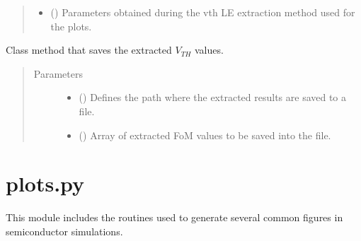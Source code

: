 \documentclass[letterpaper,10pt,english,openany, oneside]{sphinxmanual}
\begin{document}
\begin{fulllineitems}
\begin{fulllineitems}
\begin{quote}
\begin{description}
\begin{itemize}
\item {} 
 (\sphinxstyleliteralemphasis{\sphinxupquote{,}}) \textendash{} Parameters obtained during the vth LE extraction method used for the plots.

\end{itemize}

\end{description}\end{quote}

\end{fulllineitems}


\begin{fulllineitems}
\label{\detokenize{index:fompy.fom.vth_ext.save_results_to_file}}
Class method that saves the extracted \(V_{TH}\) values.
\begin{quote}\begin{description}
\item[{Parameters}] \leavevmode\begin{itemize}
\item {} 
 () \textendash{} Defines the path where the extracted results are saved to a file.

\item {} 
 () \textendash{} Array of extracted FoM values to be saved into the file.

\end{itemize}

\end{description}\end{quote}

\end{fulllineitems}


\end{fulllineitems}

\label{\detokenize{index:module-fompy.plots}}

\section{plots.py}
\label{\detokenize{index:plots-py}}
This module includes the routines used to generate several common figures
in semiconductor simulations.
\end{document}
